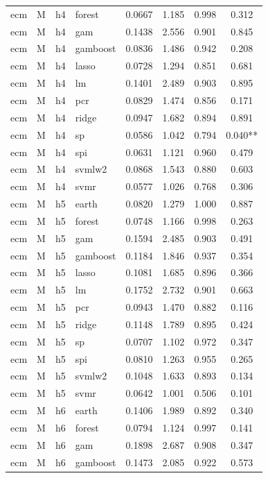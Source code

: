\begin{ThreePartTable}
\begin{longtable}[t]{llclcccc}
ecm & M & h4 & forest & 0.0667 & 1.185 & 0.998 & 0.312\\
ecm & M & h4 & gam & 0.1438 & 2.556 & 0.901 & 0.845\\
ecm & M & h4 & gamboost & 0.0836 & 1.486 & 0.942 & 0.208\\
ecm & M & h4 & lasso & 0.0728 & 1.294 & 0.851 & 0.681\\
ecm & M & h4 & lm & 0.1401 & 2.489 & 0.903 & 0.895\\
ecm & M & h4 & pcr & 0.0829 & 1.474 & 0.856 & 0.171\\
ecm & M & h4 & ridge & 0.0947 & 1.682 & 0.894 & 0.891\\
ecm & M & h4 & sp & 0.0586 & 1.042 & 0.794 & 0.040**\\
ecm & M & h4 & spi & 0.0631 & 1.121 & 0.960 & 0.479\\
ecm & M & h4 & svmlw2 & 0.0868 & 1.543 & 0.880 & 0.603\\
ecm & M & h4 & svmr & 0.0577 & 1.026 & 0.768 & 0.306\\
\addlinespace
ecm & M & h5 & earth & 0.0820 & 1.279 & 1.000 & 0.887\\
ecm & M & h5 & forest & 0.0748 & 1.166 & 0.998 & 0.263\\
ecm & M & h5 & gam & 0.1594 & 2.485 & 0.903 & 0.491\\
ecm & M & h5 & gamboost & 0.1184 & 1.846 & 0.937 & 0.354\\
ecm & M & h5 & lasso & 0.1081 & 1.685 & 0.896 & 0.366\\
ecm & M & h5 & lm & 0.1752 & 2.732 & 0.901 & 0.663\\
ecm & M & h5 & pcr & 0.0943 & 1.470 & 0.882 & 0.116\\
ecm & M & h5 & ridge & 0.1148 & 1.789 & 0.895 & 0.424\\
ecm & M & h5 & sp & 0.0707 & 1.102 & 0.972 & 0.347\\
ecm & M & h5 & spi & 0.0810 & 1.263 & 0.955 & 0.265\\
ecm & M & h5 & svmlw2 & 0.1048 & 1.633 & 0.893 & 0.134\\
ecm & M & h5 & svmr & 0.0642 & 1.001 & 0.506 & 0.101\\
\addlinespace
ecm & M & h6 & earth & 0.1406 & 1.989 & 0.892 & 0.340\\
ecm & M & h6 & forest & 0.0794 & 1.124 & 0.997 & 0.141\\
ecm & M & h6 & gam & 0.1898 & 2.687 & 0.908 & 0.347\\
ecm & M & h6 & gamboost & 0.1473 & 2.085 & 0.922 & 0.573\\

\end{longtable}
\end{ThreePartTable}

